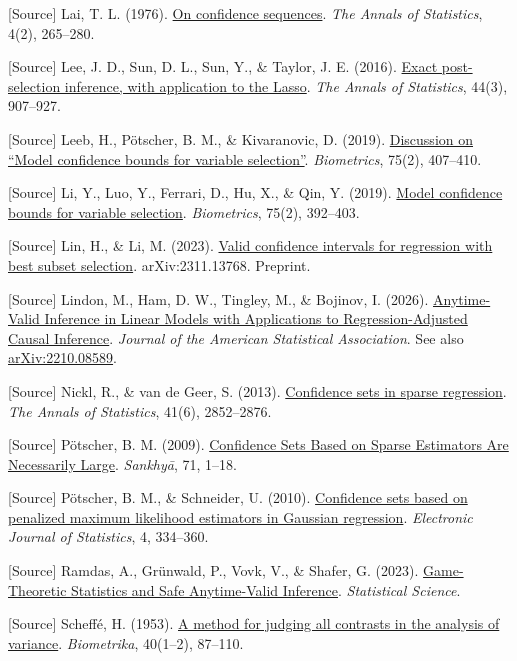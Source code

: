 \documentclass[
  english,
  11pt,
  a4paper,
]{article}
\begin{document}
{[}Source{]} Lai, T. L. (1976).
\href{https://doi.org/10.1214/aos/1176343406}{On confidence sequences}.
\emph{The Annals of Statistics}, 4(2), 265--280.

{[}Source{]} Lee, J. D., Sun, D. L., Sun, Y., \& Taylor, J. E. (2016).
\href{https://doi.org/10.1214/15-AOS1371}{Exact post-selection
inference, with application to the Lasso}. \emph{The Annals of
Statistics}, 44(3), 907--927.

{[}Source{]} Leeb, H., Pötscher, B. M., \& Kivaranovic, D. (2019).
\href{https://doi.org/10.1111/biom.13021}{Discussion on ``Model
confidence bounds for variable selection''}. \emph{Biometrics}, 75(2),
407--410.

{[}Source{]} Li, Y., Luo, Y., Ferrari, D., Hu, X., \& Qin, Y. (2019).
\href{https://doi.org/10.1111/biom.13024}{Model confidence bounds for
variable selection}. \emph{Biometrics}, 75(2), 392--403.

{[}Source{]} Lin, H., \& Li, M. (2023).
\href{https://arxiv.org/abs/2311.13768}{Valid confidence intervals for
regression with best subset selection}. arXiv:2311.13768. Preprint.

{[}Source{]} Lindon, M., Ham, D. W., Tingley, M., \& Bojinov, I. (2026).
\href{https://doi.org/10.1080/01621459.2026.2692052}{Anytime-Valid
Inference in Linear Models with Applications to Regression-Adjusted
Causal Inference}. \emph{Journal of the American Statistical
Association}. See also
\href{https://arxiv.org/abs/2210.08589}{arXiv:2210.08589}.

{[}Source{]} Nickl, R., \& van de Geer, S. (2013).
\href{https://doi.org/10.1214/13-AOS1170}{Confidence sets in sparse
regression}. \emph{The Annals of Statistics}, 41(6), 2852--2876.

{[}Source{]} Pötscher, B. M. (2009).
\href{https://arxiv.org/abs/0711.1036}{Confidence Sets Based on Sparse
Estimators Are Necessarily Large}. \emph{Sankhyā}, 71, 1--18.

{[}Source{]} Pötscher, B. M., \& Schneider, U. (2010).
\href{https://doi.org/10.1214/09-EJS523}{Confidence sets based on
penalized maximum likelihood estimators in Gaussian regression}.
\emph{Electronic Journal of Statistics}, 4, 334--360.

{[}Source{]} Ramdas, A., Grünwald, P., Vovk, V., \& Shafer, G. (2023).
\href{https://doi.org/10.1214/23-STS894}{Game-Theoretic Statistics and
Safe Anytime-Valid Inference}. \emph{Statistical Science}.

{[}Source{]} Scheffé, H. (1953).
\href{https://doi.org/10.1093/biomet/40.1-2.87}{A method for judging all
contrasts in the analysis of variance}. \emph{Biometrika}, 40(1--2),
87--110.
\end{document}
